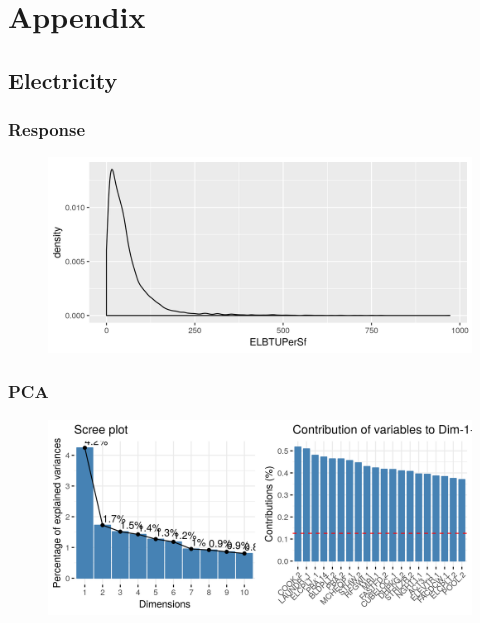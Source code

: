 \section*{Appendix}
\label{sec:appendix}

\appendix
\subsection{Electricity}
\subsubsection{Response}
\label{appendix:electricity:response}
\begin{figure}[h]
\includegraphics[width=\textwidth]{Images/electricity_response.png}
\centering
\end{figure}
\subsubsection{PCA}
\label{appendix:electricity:pca}
\begin{figure}[h]
\includegraphics[width=\textwidth]{Images/electricity_pca_vars.png}
\centering
\end{figure}
\newpage
